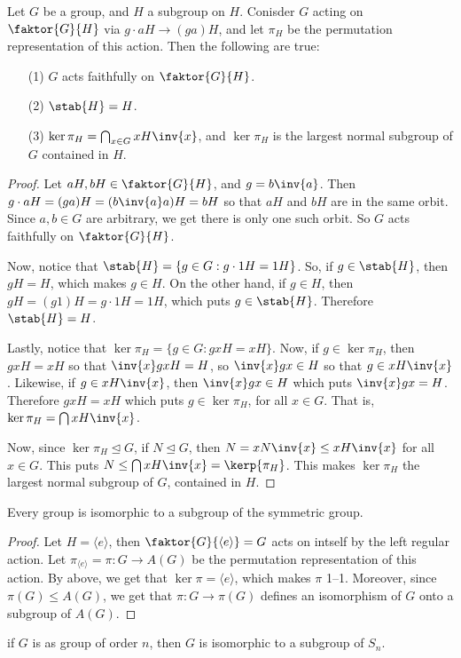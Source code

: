 \begin{theorem}\label{4.2.1}
    Let $G$ be a group, and  $H$ a subgroup on $H$. Conisder $G$ acting on
    $\faktor{G}{H}$ via $g \cdot aH \xrightarrow{} (ga)H$, and let $\pi_H$ be
    the permutation representation of this action. Then the following are true:
    \begin{enumerate}
        \item[(1)] $G$ acts faithfully on  $\faktor{G}{H}$.

        \item[(2)] $\stab{H}=H$.

        \item[(3)] $\ker{\pi_H}=\bigcap_{x \in G}{xH\inv{x}}$, and $\ker{\pi_H}$
            is the largest normal subgroup of $G$ contained in $H$.
    \end{enumerate}
\end{theorem}
\begin{proof}
    Let $aH,bH \in \faktor{G}{H}$, and $g=b\inv{a}$. Then $g \cdot
    aH=(ga)H=(b\inv{a}a)H=bH$ so that $aH$ and  $bH$ are in the same orbit.
    Since  $a,b \in G$ are arbitrary, we get there is only one such orbit. So
    $G$ acts faithfully on  $\faktor{G}{H}$.

    Now, notice that $\stab{H}=\{g \in G : g \cdot 1H=1H\}$. So, if $g \in
    \stab{H}$, then $gH=H$, which makes  $g \in H$. On the other hand, if  $g
    \in H$, then  $gH=(g1)H=g \cdot 1H=1H$, which puts $g \in \stab{H}$.
    Therefore $\stab{H}=H$.

    Lastly, notice that $\ker{\pi_H}=\{g \in G : gxH=xH\}$. Now, if $g \in
    \ker{\pi_H}$, then $gxH=xH$ so that  $\inv{x}gxH=H$, so $\inv{x}gx \in H$ so
    that $g \in xH\inv{x}$. Likewise, if $g \in xH\inv{x}$, then $\inv{x}gx \in
    H$ which puts $\inv{x}gx=H$. Therefore $gxH=xH$ which puts $g \in
    \ker{\pi_H}$, for all $x \in G$. That is, $\ker{\pi_H}=\bigcap{xH\inv{x}}$.

    Now, since $\ker{\pi_H} \unlhd G$, if $N \unlhd G$, then  $N=xN\inv{x} \leq
    xH\inv{x}$ for all $x \in G$. This puts $N \leq
    \bigcap{xH\inv{x}}=\kerp{\pi_H}$. This makes $\ker{\pi_H}$ the largest
    normal subgroup of $G$, contained in  $H$.
\end{proof}
\begin{corollary}
    Every group is isomorphic to a subgroup of the symmetric group.
\end{corollary}
\begin{proof}
    Let $H=\langle e \rangle$, then $\faktor{G}{\langle e \rangle}=G$ acts on
    intself by the left regular action. Let $\pi_{\langle e \rangle}=\pi:G
    \xrightarrow{} A(G)$ be the permutation representation of this action. By
    above, we get that $\ker{\pi}=\langle e \rangle$, which makes $\pi$ 1--1.
    Moreover, since $\pi(G) \leq A(G)$, we get that $\pi:G \xrightarrow{}
    \pi(G)$ defines an isomorphism of $G$ onto a subgroup of $A(G)$.
\end{proof}
\begin{corollary}
    if $G$ is as group of order $n$, then $G$ is isomorphic to a subgroup of
    $S_n$.
\end{corollary}


